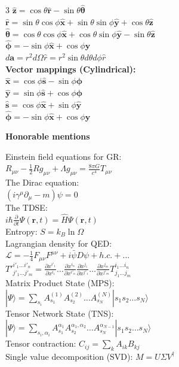 \documentclass[a4paper,twoside]{article}
\newcommand{\secblock}[1]{%
\par\vspace{3pt}%
\noindent\colorbox{hdrcol}{\parbox[c][1.1em][c]{0.98\linewidth}{\color{white}\bfseries\small #1}}\par
\vspace{2pt}%
}
\begin{document}
\begin{multicols*}{3}
\(\hat{\bm z} = \cos \theta \hat{\bm r} - \sin \theta \hat{\bm \theta}\)\\
\(\hat{\bm{r}} = \sin\theta \cos \phi \hat{\bm x} + \sin \theta \sin \phi \hat{\bm y}+\cos \theta \hat{\bm z}\)\\
\(\hat{\bm \theta} = \cos\theta\cos\phi \hat{\bm x} + \cos\theta\sin\phi \hat{\bm y} - \sin\theta \hat{\bm z}\)\\
\(\hat{\bm \phi} = -\sin\phi \hat{\bm x} + \cos\phi \hat{\bm y}\)\\
\(d \bm a = r^2 d \Omega \hat{r} = r^2 \sin \theta d\theta d\phi \hat{r}\)\\
\textbf{Vector mappings (Cylindrical):}\\
\(\hat{\bm x} = \cos \phi \hat{\bm s} - \sin \phi \hat{\bm \phi}\)\\
\(\hat{\bm y} = \sin \phi \hat{\bm s} + \cos \phi \hat{\bm \phi}\)\\
\(\hat{\bm s} = \cos \phi \hat{\bm x} + \sin \phi \hat{\bm y}\)\\
\(\hat{\bm \phi} = -\sin \phi \hat{\bm x} + \cos \phi \hat{\bm y}\)

\secblock{Honorable mentions}
Einstein field equations for GR:\\
\(R_{\mu\nu} - \frac{1}{2}R g_{\mu\nu} + \Lambda g_{\mu\nu} = \frac{8\pi G}{c^4} T_{\mu\nu}\)\\
The Dirac equation:\\
\((i\gamma^\mu \partial_\mu - m)\psi = 0\)\\
The TDSE:\\
\(i\hbar \frac{\partial}{\partial t} \Psi(\mathbf{r}, t) = \hat{H} \Psi(\mathbf{r}, t)\)\\
Entropy: \(S = k_B \ln \Omega\)\\
Lagrangian density for QED:\\
\(\mathcal{L} = -\frac{1}{4}F_{\mu\nu}F^{\mu\nu} + i\bar{\psi}D\psi + h.c. + \dots \)\\
\(T'^{i'_1 \dots i'_n}_{j'_1 \dots j'_m} = \frac{\partial x^{i'_1}}{\partial x^{i_1}} \dots \frac{\partial x^{i_n}}{\partial x^{i'_n}} \frac{\partial x^{j_1}}{\partial x^{j'_1}} \dots \frac{\partial x^{j_m}}{\partial x^{j'_m}} T^{i_1 \dots i_n}_{j_1 \dots j_m}\)\\
Matrix Product State (MPS):\\
\(|\Psi\rangle = \sum_{s_i} A^{(1)}_{s_1} A^{(2)}_{s_2} \dots A^{(N)}_{s_N} |s_1 s_2 \dots s_N\rangle\)\\
Tensor Network State (TNS):\\
\(|\Psi\rangle = \sum_{s_i,\alpha_i} A_{s_1}^{\alpha_1} A^{ \alpha_1, \alpha_2}_{s_2} \dots A^{\alpha_{N-1}}_{s_N} |s_1 s_2 \dots s_N\rangle\) \\
Tensor contraction: \(C_{ij} = \sum_{k} A_{ik} B_{kj}\)\\
Single value decomposition (SVD): \(M = U \Sigma V^\dagger\)

\end{multicols*}
\end{document}
